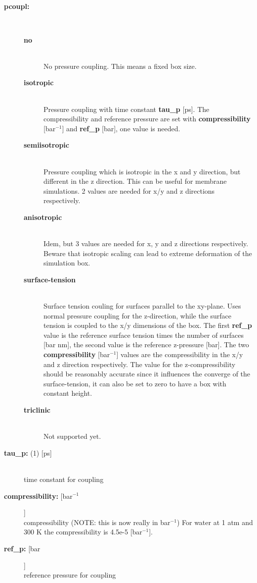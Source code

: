 \subsection{}
\begin{description}
\item[{\bf pcoupl:}]\mbox{}\\
\vspace{-2ex}\begin{description}
\item[{\bf no}]\mbox{}\\
No pressure coupling. This means a fixed box size.
\item[{\bf isotropic}]\mbox{}\\
Pressure coupling with time constant {\bf tau\_p} [ps].
The compressibility and reference pressure are set with
{\bf compressibility} [bar$^{-1}$] and {\bf ref\_p} [bar], one
value is needed.
\item[{\bf semiisotropic}]\mbox{}\\
Pressure coupling which is isotropic in the x and y direction,
but different in the z direction.
This can be useful for membrane simulations.
2 values are needed for x/y and z directions respectively.
\item[{\bf anisotropic}]\mbox{}\\
Idem, but 3 values are needed for x, y and z directions respectively.
Beware that isotropic scaling can lead to extreme deformation
of the simulation box.
\item[{\bf surface-tension}]\mbox{}\\
Surface tension couling for surfaces parallel to the xy-plane.
Uses normal pressure coupling for the z-direction, while the surface tension
is coupled to the x/y dimensions of the box.
The first {\bf ref\_p} value is the reference surface tension times
the number of surfaces [bar nm], 
the second value is the reference z-pressure [bar].
The two {\bf compressibility} [bar$^{-1}$] values are the compressibility
in the x/y and z direction respectively.
The value for the z-compressibility should be reasonably accurate since it
influences the converge of the surface-tension, it can also be set to zero
to have a box with constant height.
\item[{\bf triclinic}]\mbox{}\\
Not supported yet.
\end{description}
\item[{\bf tau\_p: }(1) {[ps]}]\mbox{}\\
time constant for coupling
\item[{\bf compressibility: }[bar$^{-1}$]]\mbox{}\\
compressibility (NOTE: this is now really in bar$^{-1}$)
For water at 1 atm and 300 K the compressibility is 4.5e-5 [bar$^{-1}$].
\item[{\bf ref\_p: }[bar]]\mbox{}\\
reference pressure for coupling
\end{description}

